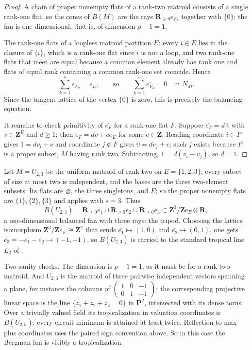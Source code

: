\begin{proof}
A chain of proper nonempty flats of a rank-two matroid consists of a single
rank-one flat, so the cones of $B(M)$ are the rays
$\mathbf R_{\geq0}\overline{e_{F_k}}$ together with $\{0\}$; the fan is
one-dimensional, that is, of dimension $\rho-1=1$.

The rank-one flats of a loopless matroid partition $E$: every $i\in E$ lies
in the closure of $\{i\}$, which is a rank-one flat since $i$ is not a loop,
and two rank-one flats that meet are equal because a common element already
has rank one and flats of equal rank containing a common rank-one set
coincide.  Hence
\[
 \sum_{k=1}^se_{F_k}=e_E,
 \qquad\text{so}\qquad
 \sum_{k=1}^s\overline{e_{F_k}}=0
 \quad\text{in }N_M .
\]
Since the tangent lattice of the vertex $\{0\}$ is zero, this is precisely
the balancing equation.

It remains to check primitivity of $\overline{e_{F}}$ for a rank-one flat
$F$.  Suppose $\overline{e_F}=d\,\overline v$ with $v\in\mathbf Z^E$ and
$d\geq1$; then $e_F=dv+ce_E$ for some $c\in\mathbf Z$.  Reading coordinate
$i\in F$ gives $1=dv_i+c$ and coordinate $j\notin F$ gives $0=dv_j+c$; such
$j$ exists because $F$ is a proper subset, $M$ having rank two.  Subtracting,
$1=d(v_i-v_j)$, so $d=1$.
\end{proof}

\begin{example}
\label{ex:ch10-bergman-u23}
Let $M=U_{2,3}$ be the uniform matroid of rank two on $E=\{1,2,3\}$: every
subset of size at most two is independent, and the bases are the three
two-element subsets.  Its flats are $\varnothing$, the three singletons, and
$E$; so the proper nonempty flats are $\{1\},\{2\},\{3\}$ and
 applies with $s=3$.  Thus
\[
 B(U_{2,3})
 =\mathbf R_{\geq0}\overline{e_1}\cup
  \mathbf R_{\geq0}\overline{e_2}\cup
  \mathbf R_{\geq0}\overline{e_3}
 \subset\mathbf Z^3/\mathbf Ze_E\otimes\mathbf R,
\]
a one-dimensional balanced fan with three rays: the tripod.  Choosing the
lattice isomorphism $\mathbf Z^3/\mathbf Ze_E\cong\mathbf Z^2$ that sends
$\overline{e_1}\mapsto(1,0)$ and $\overline{e_2}\mapsto(0,1)$, one gets
$\overline{e_3}=-\overline{e_1}-\overline{e_2}\mapsto(-1,-1)$, so
$B(U_{2,3})$ is carried to the standard tropical line $L_2$ of
.

Two sanity checks.  The dimension is $\rho-1=1$, as it must be for a rank-two
matroid.  And $U_{2,3}$ is the matroid of three pairwise independent vectors
spanning a plane, for instance the columns of
$\left(\begin{smallmatrix}1&0&-1\\0&1&-1\end{smallmatrix}\right)$; the
corresponding projective linear space is the line
$\{z_1+z_2+z_3=0\}$ in $\mathbf P^2$, intersected with its dense torus.
Over a trivially valued field its tropicalization in valuation coordinates
is $B(U_{2,3})$: every circuit minimum is attained at least twice. Reflection
to max-plus coordinates uses the paired sign convention above. So in this
case the Bergman fan is visibly a tropicalization.
\end{example}

